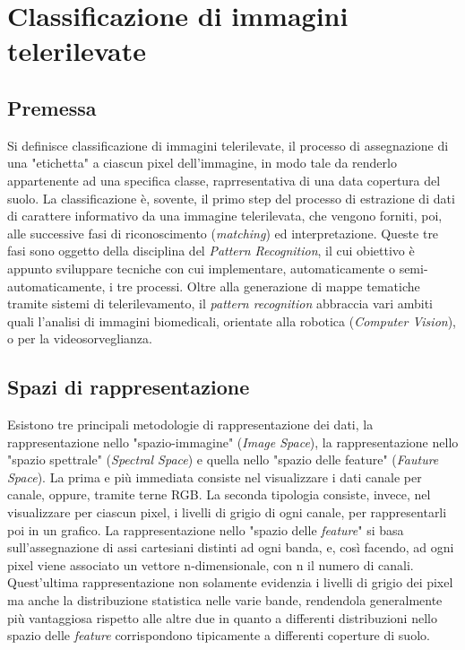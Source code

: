 \section{Classificazione di immagini telerilevate}

\subsection{Premessa}

Si definisce classificazione di immagini telerilevate, il processo di assegnazione di una "etichetta" a ciascun pixel dell'immagine, in modo tale da renderlo appartenente ad una specifica classe, raprresentativa di una data copertura del suolo.
La classificazione è, sovente, il primo step del processo di estrazione di dati di carattere informativo da una immagine telerilevata, che vengono forniti, poi, alle successive fasi di riconoscimento (\emph{matching}) ed interpretazione. 
Queste tre fasi sono oggetto della disciplina del \emph{Pattern Recognition}, il cui obiettivo è appunto sviluppare tecniche con cui implementare, automaticamente o semi-automaticamente, i tre processi.
Oltre alla generazione di mappe tematiche tramite sistemi di telerilevamento, il \emph{pattern recognition} abbraccia vari ambiti quali l'analisi di immagini biomedicali, orientate alla robotica (\emph{Computer Vision}), o per la videosorveglianza.   


\subsection{Spazi di rappresentazione}

Esistono tre principali metodologie di rappresentazione dei dati, la rappresentazione nello "spazio-immagine" (\emph{Image Space}), la rappresentazione nello "spazio spettrale" (\emph{Spectral Space}) e quella nello "spazio delle feature" (\emph{Fauture Space}). La prima e più immediata consiste nel visualizzare i dati canale per canale, oppure, tramite terne RGB. La seconda tipologia consiste, invece, nel visualizzare per ciascun pixel, i livelli di grigio di ogni canale, per rappresentarli poi in un grafico. La rappresentazione nello "spazio delle \emph{feature}" si basa sull'assegnazione di assi cartesiani distinti ad ogni banda, e, così facendo, ad ogni pixel viene associato un vettore n-dimensionale, con n il numero di canali. Quest'ultima rappresentazione non solamente evidenzia i livelli di grigio dei pixel ma anche la distribuzione statistica nelle varie bande, rendendola generalmente più vantaggiosa rispetto alle altre due in quanto a differenti distribuzioni nello spazio delle \emph{feature} corrispondono tipicamente a differenti coperture di suolo.  

